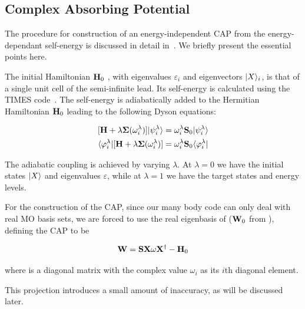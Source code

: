 \subsection{Complex Absorbing Potential}
\label{subsec:CAP}

The procedure for construction of an energy-independent \ac{CAP} from the
energy-dependant self-energy is discussed in detail in~\cite{henderson}. We
briefly present the essential points here.

The initial Hamiltonian $\mathbf{H}_0$ , with eigenvalues $\varepsilon_i$ and
eigenvectors $|X \rangle_i$, is that of a single unit cell of the semi-infinite
lead. Its self-energy is calculated using the TIMES code~\cite{times}. The
self-energy is adiabatically added to the Hermitian Hamiltonian $\mathbf{H}_0$
leading to the following Dyson equations:

\begin{subequations}
\begin{align}
	[\mathbf{H} + \lambda \mathbf{\Sigma}(\omega_i^\lambda)] |\psi_i^\lambda \rangle
	&= \omega_i^\lambda \mathbf{S}_0 |\psi_i^\lambda \rangle \\
	\langle \varphi_i^\lambda| [\mathbf{H} + \lambda \mathbf{\Sigma}(\omega_i^\lambda)]
	&= \omega_i^\lambda \mathbf{S}_0 \langle \varphi_i^\lambda| 
	\label{eq:adiabaticap}
\end{align}
\end{subequations}

The adiabatic coupling is achieved by varying $\lambda$. At $\lambda = 0$ we
have the initial states $|X \rangle$ and eigenvalues $\varepsilon$, while at
$\lambda = 1$ we have the target states and energy levels.

For the construction of the \ac{CAP}, since our many body code can only deal
with real MO basis sets, we are forced to use the real eigenbasis of 
($\mathbf{W}_0$ from \cite{henderson}), defining the \ac{CAP} to be

\begin{equation}
	\mathbf{W} = \mathbf{S}\mathbf{X}\mathbf{\omega}\mathbf{X}^\dagger - \mathbf{H}_0
	\label{eq:capsdef}
\end{equation}

where \umm{\omega} is a diagonal matrix with the complex value $\omega_i$ as
its $i$th diagonal element.

This projection introduces a small amount of inaccuracy, as will be discussed
later.

